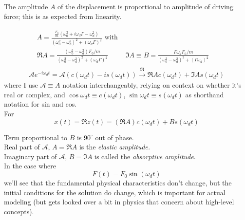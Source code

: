 \documentclass[10pt]{amsart}
\begin{document}
\begin{multicols*}{2}
The amplitude $A$ of the displacement is proportional to amplitude of driving force; this is as expected from linearity.

\[
\begin{gathered}
	\begin{aligned}
		& A = \frac{ \frac{F_0}{m} (\omega_0^2 + i \omega_d \Gamma - \omega_d^2 )}{ (\omega_0^2 - \omega_d^2)^2 + (\omega_d \Gamma)^2 } \text{ with } & \\
		& \Re{A} = \frac{ (\omega_0^2 - \omega_d^2) F_0/m }{(\omega_0^2 - \omega_d^2)^2 + (\omega_d \Gamma)^2} & \Im{A} \equiv B = \frac{ \Gamma \omega_d F_0 /m }{ (\omega_0^2 - \omega_d^2)^2 + (\Gamma \omega_d )^2 }
			\end{aligned} \\
		\mathcal{A} e^{- i\omega_d t} = \mathcal{A} ( c(\omega_dt) - i s(\omega_dt)) \xrightarrow{\Re} \Re{A } c(\omega_d t) + \Im{A} s(\omega_d t)
\end{gathered}
\]
where I use $\mathcal{A} \equiv A$ notation interchangeably, relying on context on whether it's real or complex, and $\cos{\omega_d t} \equiv c(\omega_d t)$, $\sin{\omega_d t} \equiv s(\omega_d t)$ as shorthand notation for sin and cos. \\

For 
\[
x(t) = \Re{z(t)} = (\Re{A}) c(\omega_d t) + Bs(\omega_d t)
\]

Term proportional to $B$ is $90^{\circ}$ out of phase. \\
Real part of $\mathcal{A}$, $A = \Re{A}$ is the \emph{elastic amplitude.} \\
Imaginary part of $\mathcal{A}$, $B = \Im{A}$ is called the \emph{absorptive amplitude}. \\

In the case where 
\[
	F(t) = F_0 \sin{(\omega_dt)}
\]
we'll see that the fundamental physical characteristics don't change, but the initial conditions for the solution do change, which is important for actual modeling (but gets looked over a bit in physics that concern about high-level concepts).


\end{multicols*}
\end{document}

